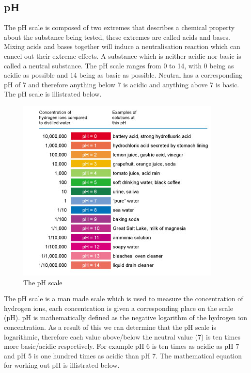 	\subsection{pH}

The pH scale is composed of two extremes that describes a chemical property about the substance being tested, these extremes are called acids and bases. Mixing acids and bases together will induce a neutralisation reaction which can cancel out their extreme effects. A substance which is neither acidic nor basic is called a neutral substance. The pH scale ranges from 0 to 14, with 0 being as acidic as possible and 14 being as basic as possible. Neutral has a corresponding pH of 7 and therefore anything below 7 is acidic and anything above 7 is basic. The pH scale is illistrated below.


\begin{figure}[H]
    \includegraphics[width=\textwidth]{./Planning/Images/pHScale.jpg}
    \caption{The pH scale} \label{fig:pH Scale}
\end{figure}

The pH scale is a man made scale which is used to measure the concentration of hydrogen ions, each concentration is given a corresponding place on the scale (pH). pH is mathematically defined as the negative logarithm of the hydrogen ion concentration. As a result of this we can determine that the pH scale is logarithmic, therefore each value above/below the neutral value (7) is ten times more basic/acidic respectively. For example pH 6 is ten times as acidic as pH 7  and pH 5 is one hundred times as acidic than pH 7. The mathematical equation for working out pH is illistrated below.

